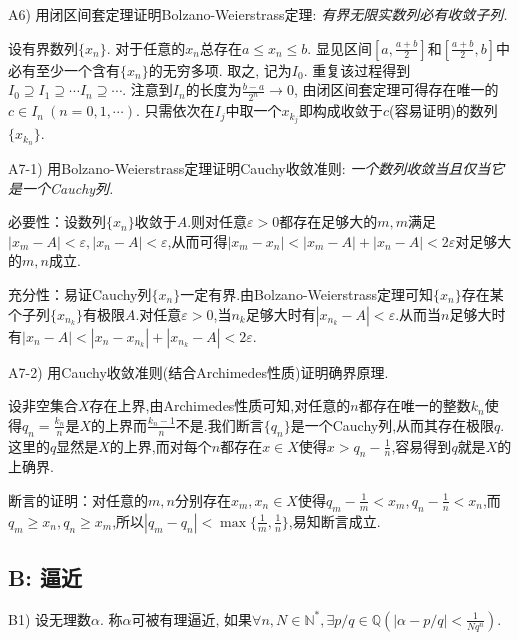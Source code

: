 A6) 用闭区间套定理证明Bolzano-Weierstrass定理: \textit{有界无限实数列必有收敛子列.}

\begin{solution}
	设有界数列$\{ x_n \}$. 对于任意的$x_n$总存在$a \leq x_n \leq b$. 显见区间$[a,\frac{a+b}{2}]$和$[\frac{a+b}{2},b]$中必有至少一个含有$\{ x_n \}$的无穷多项. 取之, 记为$I_0$. 重复该过程得到$I_0 \supseteq I_1 \supseteq \cdots I_n \supseteq \cdots$. 注意到$I_n$的长度为$\frac{b-a}{2^n} \to 0$, 由闭区间套定理可得存在唯一的$c \in I_n~(n=0,1,\cdots)$. 只需依次在$I_j$中取一个$x_{k_j}$即构成收敛于$c$(容易证明)的数列$\{ x_{k_n} \}$. 
\end{solution}

A7-1) 用Bolzano-Weierstrass定理证明Cauchy收敛准则: \textit{一个数列收敛当且仅当它是一个Cauchy列. }

\begin{solution}
	必要性：设数列$\{ x_n \}$收敛于$A$.则对任意$\varepsilon >0$都存在足够大的$m,m$满足$|x_m-A|<\varepsilon ,|x_n-A|<\varepsilon$,从而可得$|x_m-x_n|<|x_m-A|+|x_n-A|<2\varepsilon$对足够大的$m,n$成立.
	
	充分性：易证Cauchy列$\{ x_n \}$一定有界.由Bolzano-Weierstrass定理可知$\{ x_n \}$存在某个子列$\{ x_{n_k} \}$有极限$A$.对任意$\varepsilon >0$,当$n_k$足够大时有$|x_{n_k} - A|<\varepsilon$.从而当$n$足够大时有$|x_n-A|<|x_n-x_{n_k}|+|x_{n_k}-A|<2\varepsilon$.
\end{solution}

A7-2) 用Cauchy收敛准则(结合Archimedes性质)证明确界原理. 

\begin{solution}
	设非空集合$X$存在上界,由Archimedes性质可知,对任意的$n$都存在唯一的整数$k_n$使得$q_n=\frac{k_n}{n}$是$X$的上界而$\frac{k_n-1}{n}$不是.我们断言$\{ q_n \}$是一个Cauchy列,从而其存在极限$q$.这里的$q$显然是$X$的上界,而对每个$n$都存在$x \in X$使得$x>q_n-\frac{1}{n}$,容易得到$q$就是$X$的上确界.
	
	断言的证明：对任意的$m,n$分别存在$x_m,x_n \in X$使得$q_m-\frac{1}{m} < x_m,q_n-\frac{1}{n} < x_n$,而$q_m \geq x_n,q_n \geq x_m$,所以$|q_m-q_n|<\max \{ \frac{1}{m},\frac{1}{n} \}$,易知断言成立.
\end{solution}

\subsection*{B: 逼近}

B1) 设无理数$\alpha$. 称$\alpha$可被有理逼近, 如果$\forall n,N \in \mathbb{N}^{*}, \exists p/q \in \mathbb{Q} \left(|\alpha - p/q | < \frac{1}{Nq^n} \right)$. 

